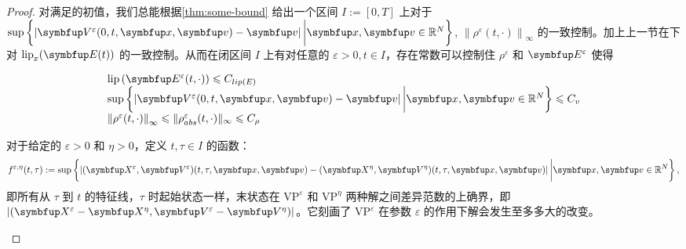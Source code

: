 \begin{proof}
对满足\supremumf 的初值，我们总能根据\ref{thm:some-bound} 给出一个区间 $I:=[0,T]$ 上对于 
$\sup \left\{\left|\vect{V}^{\varepsilon}(0, t, \vx, \vv)-\vv\right| \bigg|\vx, \vv\in \bbR^{N}\right\}$, $\left\|\rho^{\varepsilon}(t, \cdot)\right\|_{\infty}$ 的一致控制。加上上一节在\lipOffVsphere 下对 $\operatorname{lip}_{x}(\vE(t))$ 的一致控制。从而在闭区间 $I$ 上有对任意的 $\varepsilon>0, t \in I$，存在常数可以控制住 $\rho^\varepsilon$ 和 $\vE^\varepsilon$ 使得



\[
\begin{array}{l}
\operatorname{lip}\left(\vE^{\varepsilon}(t, \cdot)\right) \leqslant C_{lip(E)} \\
\sup \left\{\left|\vect{V}^{\varepsilon}(0, t, \vx, \vv)-\vv\right| \bigg|\vx, \vv\in \bbR^{N}\right\} \leqslant C_{v} \\
\left\|\rho^{\varepsilon}(t, \cdot)\right\|_{\infty} \leqslant \| \rho^{\varepsilon}_{abs}(t, \cdot)\|_{\infty} \leqslant C_\rho%
\end{array}
\]



\begin{definition}
对于给定的 $\varepsilon>0$ 和 $\eta>0$，定义 $t, \tau \in I$ 的函数：
\[
f^{\varepsilon, \eta}(t, \tau):=\sup \left\{\left|(\vect{X}^{\varepsilon},\vect{V}^{\varepsilon})(t, \tau, \vx, \vv)-(\vect{X}^{\eta},\vect{V}^{\eta})(t, \tau, \vx, \vv)\right| \bigg|\vx, \vv\in \bbR^{N}\right\},
\]
即所有从 $\tau$ 到 $t$ 的特征线，$\tau$ 时起始状态一样，末状态在 $\text{VP}^\varepsilon$ 和 $\text{VP}^\eta$ 两种解之间差异范数的上确界，即 $|(\vect{X}^\varepsilon - \vect{X}^\eta, \vect{V}^\varepsilon-\vect{V}^\eta)|$。它刻画了 $\text{VP}^\varepsilon$ 在参数 $\varepsilon$ 的作用下解会发生至多多大的改变。 
\end{definition} 


\end{proof}

